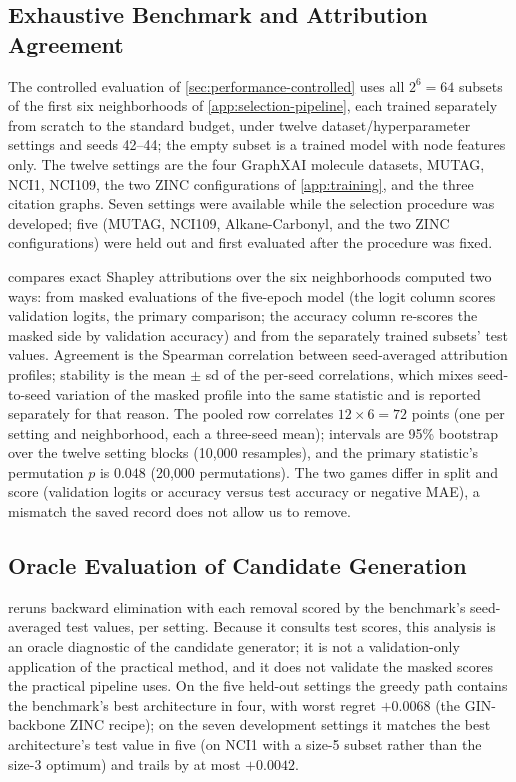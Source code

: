 \subsection{Exhaustive Benchmark and Attribution Agreement}
\label{app:benchmark}

The controlled evaluation of \cref{sec:performance-controlled} uses
all $2^{6} = 64$ subsets of the first six neighborhoods of \cref{app:selection-pipeline}, each trained separately from scratch to the standard budget, under twelve dataset/hyperparameter settings and
seeds 42--44; the empty subset is a trained model with node features only. The twelve settings are the four GraphXAI molecule datasets, MUTAG, NCI1, NCI109, the two ZINC configurations of
\cref{app:training}, and the three citation graphs. Seven settings were available while the selection procedure was developed; five (MUTAG, NCI109, Alkane-Carbonyl, and the two ZINC configurations) were held out and first evaluated after the procedure was fixed.

\label{app:attr-agreement}
 compares exact Shapley attributions over the
six neighborhoods computed two ways: from masked evaluations of the
five-epoch model (the logit column scores validation logits, the
primary comparison; the accuracy column re-scores the masked side by
validation accuracy) and from the separately trained subsets' test
values. Agreement is the Spearman correlation between seed-averaged
attribution profiles; stability is the mean $\pm$ sd of the per-seed
correlations, which mixes seed-to-seed variation of the masked profile
into the same statistic and is reported separately for that reason.
The pooled row correlates $12 \times 6 = 72$ points (one per setting
and neighborhood, each a three-seed mean); intervals are 95\%
bootstrap over the twelve setting blocks (10{,}000 resamples), and the
primary statistic's permutation $p$ is $0.048$ (20{,}000
permutations). The two games differ in split and score (validation
logits or accuracy versus test accuracy or negative MAE), a mismatch
the saved record does not allow us to remove.



\subsection{Oracle Evaluation of Candidate Generation}
\label{app:selection-evidence}

 reruns backward elimination with each
removal scored by the benchmark's seed-averaged test values, per
setting. Because it consults test scores, this analysis is an oracle
diagnostic of the candidate generator; it is not a validation-only
application of the practical method, and it does not validate the
masked scores the practical pipeline uses. On the five held-out
settings the greedy path contains the benchmark's best architecture in
four, with worst regret $+0.0068$ (the GIN-backbone ZINC recipe); on
the seven development settings it matches the best architecture's
test value in five (on NCI1 with a size-5 subset rather than the
size-3 optimum) and trails by at most $+0.0042$.


